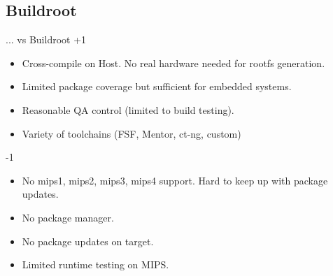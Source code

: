 \documentclass{beamer}
\begin{document}
\subsection{Buildroot}
\begin{frame}{... vs Buildroot}
+1
	\begin{itemize}
		\item Cross-compile on Host. No real hardware needed for rootfs generation.
		\item Limited package coverage but sufficient for embedded systems.
		\item Reasonable QA control (limited to build testing).
		\item Variety of toolchains (FSF, Mentor, ct-ng, custom)
	\end{itemize}
-1
	\begin{itemize}
		\item No mips1, mips2, mips3, mips4 support. Hard to keep up with package updates.
		\item No package manager.
		\item No package updates on target.
		\item Limited runtime testing on MIPS.
	\end{itemize}
\end{frame}
\end{document}

